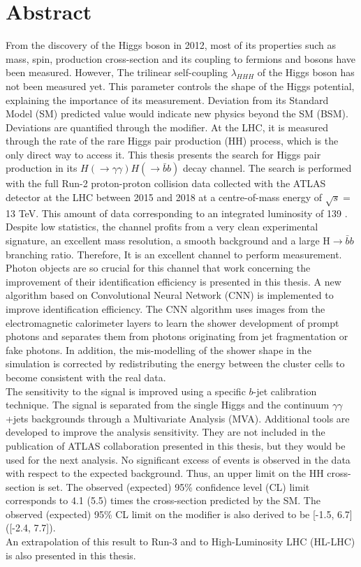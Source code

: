 \newpage
\chapter*{Abstract}
From the discovery of the Higgs boson in 2012, most of its properties such as mass, spin, production cross-section and its coupling to fermions and bosons have been measured. However, The trilinear self-coupling $\lambda_{HHH}$ of the Higgs boson has not been measured yet. This parameter controls the shape of the Higgs potential, explaining the importance of its measurement. Deviation from its Standard Model (SM) predicted value would indicate new physics beyond the SM (BSM). Deviations are quantified through the \kl modifier. At the LHC, it is measured through the rate of the rare Higgs pair production (HH) process, which is the only direct way to access it. This thesis presents the search for Higgs pair production in its $H(\to\gamma\gamma)H(\to\bar{b}b)$ decay channel. The search is performed with the full Run-2 proton-proton collision data collected with the ATLAS detector at the LHC between 2015 and 2018 at a centre-of-mass energy of $\sqrt{s} = $ 13 TeV. This amount of data corresponding to an integrated luminosity of 139 \ifb. Despite low statistics, the \bbyy channel profits from a very clean experimental signature, an excellent \myy mass resolution, a smooth background and a large H$\to\bar{b}b$ branching ratio. Therefore, It is an excellent channel to perform \kl measurement. \\
Photon objects are so crucial for this channel that work concerning the improvement of their identification efficiency is presented in this thesis. A new algorithm based on Convolutional Neural Network (CNN) is implemented to improve identification efficiency. The CNN algorithm uses images from the electromagnetic calorimeter layers to learn the shower development of prompt photons and separates them from photons originating from jet fragmentation or fake photons. In addition, the mis-modelling of the shower shape in the simulation is corrected by redistributing the energy between the cluster cells to become consistent with the real data. \\
The sensitivity to the \HHyybb signal is improved using a specific $b$-jet calibration technique. The signal is separated from the single Higgs and the continuum $\gamma\gamma$+jets backgrounds through a Multivariate Analysis (MVA). Additional tools are developed to improve the analysis sensitivity. They are not included in the publication of ATLAS collaboration presented in this thesis, but they would be used for the next analysis. No significant excess of \HHyybb events is observed in the data with respect to the expected background. Thus, an upper limit on the HH cross-section is set. The observed (expected) 95\% confidence level (CL) limit corresponds to 4.1 (5.5) times the cross-section predicted by the SM. The observed (expected) 95\% CL limit on the \kl modifier is also derived to be [-1.5, 6.7] ([-2.4, 7.7]).  \\
An extrapolation of this result to Run-3 and to High-Luminosity LHC (HL-LHC) is also presented in this thesis.

